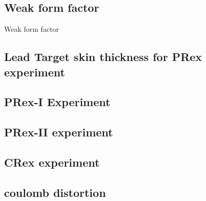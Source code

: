 \subsection{Weak form factor}

Weak form factor

\subsection{Lead Target skin thickness for PRex experiment}

\subsection{PRex-I Experiment}
\subsection{PRex-II experiment}
\subsection{CRex experiment}
\subsection{coulomb distortion}







